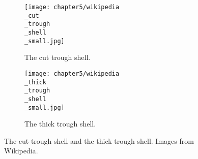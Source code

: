 \begin{figure}[H]
    \centering
    \begin{subfigure}[b]{\textwidth}
        \texttt{[image: chapter5/wikipedia\\\_cut\\\_trough\\\_shell\\\_small.jpg]}
        \caption{The cut trough shell.}
        \label{fig:5_wikipedia_cut_trough_shell}
    \end{subfigure}
    \hfill
    \begin{subfigure}[b]{\textwidth}
        \texttt{[image: chapter5/wikipedia\\\_thick\\\_trough\\\_shell\\\_small.jpg]}
        \caption{The thick trough shell.}
        \label{fig:5_wikipedia_thick_trough_shell}
    \end{subfigure}
    \caption{The cut trough shell and the thick trough shell. Images from Wikipedia.}
    \label{fig:5_wikipedia_cut_vs_thick}
\end{figure}

